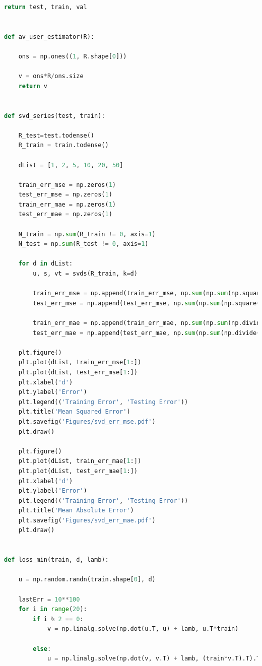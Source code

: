 \documentclass{article}
\newcommand{\1}{\mathbf{1}}
\begin{document}
\begin{enumerate}
\begin{lstlisting}[language=Python]
    return test, train, val


def av_user_estimator(R):

    ons = np.ones((1, R.shape[0]))

    v = ons*R/ons.size
    return v


def svd_series(test, train):

    R_test=test.todense()
    R_train = train.todense()

    dList = [1, 2, 5, 10, 20, 50]

    train_err_mse = np.zeros(1)
    test_err_mse = np.zeros(1)
    train_err_mae = np.zeros(1)
    test_err_mae = np.zeros(1)

    N_train = np.sum(R_train != 0, axis=1)
    N_test = np.sum(R_test != 0, axis=1)

    for d in dList:
        u, s, vt = svds(R_train, k=d)

        train_err_mse = np.append(train_err_mse, np.sum(np.sum(np.square(np.dot(u, vt) - R_train)))/train.nnz)
        test_err_mse = np.append(test_err_mse, np.sum(np.sum(np.square(np.dot(u, vt) - R_test)))/test.nnz)

        train_err_mae = np.append(train_err_mae, np.sum(np.sum(np.divide(np.absolute(np.dot(u, vt) - R_train), N_train))) / R_train.shape[0])
        test_err_mae = np.append(test_err_mae, np.sum(np.sum(np.divide(np.absolute(np.dot(u, vt) - R_test), N_test))) / R_test.shape[0])

    plt.figure()
    plt.plot(dList, train_err_mse[1:])
    plt.plot(dList, test_err_mse[1:])
    plt.xlabel('d')
    plt.ylabel('Error')
    plt.legend(('Training Error', 'Testing Error'))
    plt.title('Mean Squared Error')
    plt.savefig('Figures/svd_err_mse.pdf')
    plt.draw()

    plt.figure()
    plt.plot(dList, train_err_mae[1:])
    plt.plot(dList, test_err_mae[1:])
    plt.xlabel('d')
    plt.ylabel('Error')
    plt.legend(('Training Error', 'Testing Error'))
    plt.title('Mean Absolute Error')
    plt.savefig('Figures/svd_err_mae.pdf')
    plt.draw()


def loss_min(train, d, lamb):

    u = np.random.randn(train.shape[0], d)

    lastErr = 10**100
    for i in range(20):
        if i % 2 == 0:
            v = np.linalg.solve(np.dot(u.T, u) + lamb, u.T*train)

        else:
            u = np.linalg.solve(np.dot(v, v.T) + lamb, (train*v.T).T).T


\end{lstlisting}
\end{enumerate}
\end{document}
